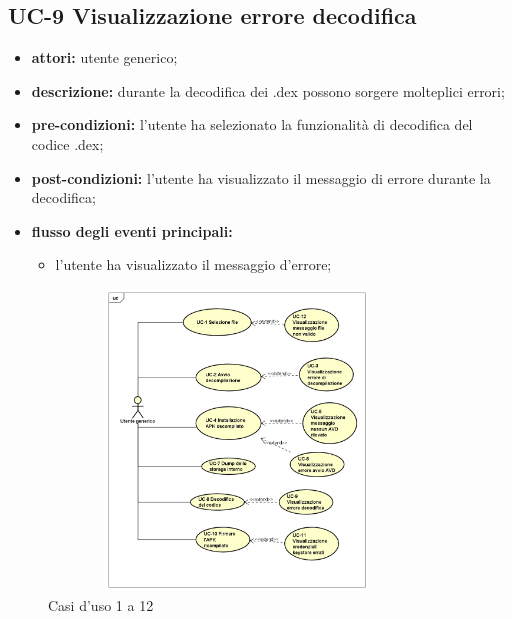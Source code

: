 \subsection*{UC-9 Visualizzazione errore decodifica}\label{subsec:uc-9-visualizzazione-errore-decodifica}
\begin{itemize}
    \item \textbf{attori:} utente generico;
    \item \textbf{descrizione:} durante la decodifica dei .dex possono sorgere molteplici errori;
    \item \textbf{pre-condizioni:} l'utente ha selezionato la funzionalità di decodifica del codice .dex;
    \item \textbf{post-condizioni:} l'utente ha visualizzato il messaggio di errore durante la decodifica;
    \item \textbf{flusso degli eventi principali:}
    \begin{itemize}
        \item l'utente ha visualizzato il messaggio d'errore;
    \end{itemize}
\end{itemize}

\begin{figure}[H]
    \centering
    \includegraphics[width=10cm, height=8cm]{./immagini/usecase/uc_principali.png}
    \caption{Casi d'uso 1 a 12}
\end{figure}

